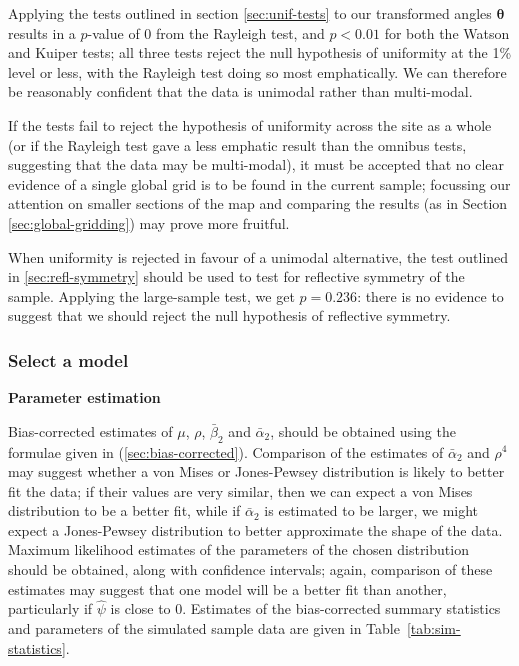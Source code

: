 \documentclass[../../ArchStats.tex]{subfiles}
\begin{document}
Applying the tests outlined in section \ref{sec:unif-tests} to our transformed angles $\boldsymbol{\theta}$ results in a $p$-value of 0 from the Rayleigh test, and $p < 0.01$ for both the Watson and Kuiper tests; all three tests reject the null hypothesis of uniformity at the 1\% level or less, with the Rayleigh test doing so most emphatically. We can therefore be reasonably confident that the data is unimodal rather than multi-modal.

If the tests fail to reject the hypothesis of uniformity across the site as a whole (or if the Rayleigh test gave a less emphatic result than the omnibus tests, suggesting that the data may be multi-modal), it must be accepted that no clear evidence of a single global grid is to be found in the current sample; focussing our attention on smaller sections of the map and comparing the results (as in Section \ref{sec:global-gridding}) may prove more fruitful. 

When uniformity is rejected in favour of a unimodal alternative, the test outlined in \ref{sec:refl-symmetry} should be used to test for reflective symmetry of the sample. 
Applying the large-sample test, we get $p = 0.236$: there is no evidence to suggest that we should reject the null hypothesis of reflective symmetry.

\subsubsection{Select a model}
\label{sssec:model-selection}

\textbf{Parameter estimation}

Bias-corrected estimates of $\mu$, $\rho$, $\bar{\beta}_2$ and $\bar{\alpha}_2$, should be obtained using the formulae given in (\ref{sec:bias-corrected}). Comparison of the estimates of $\bar{\alpha}_2$ and $\rho^4$ may suggest whether a von Mises or Jones-Pewsey distribution is likely to better fit the data; if their values are very similar, then we can expect a von Mises distribution to be a better fit, while if $\bar{\alpha}_2$ is estimated to be larger, we might expect a Jones-Pewsey distribution to better approximate the shape of the data. Maximum likelihood estimates of the parameters of the chosen distribution should be obtained, along with confidence intervals; again, comparison of these estimates may suggest that one model will be a better fit than another, particularly if $\hat{\psi}$ is close to 0. Estimates of the bias-corrected summary statistics and parameters of the simulated sample data are given in Table~\ref{tab:sim-statistics}.
\end{document}
